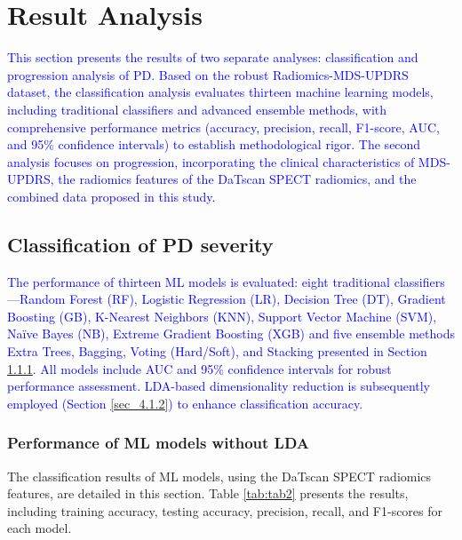 \documentclass[twocolumn]{article}
\begin{document}
\section{Result Analysis}
\label{Result}

\textcolor{blue}{This section presents the results of two separate analyses: classification and progression analysis of PD. Based on the robust Radiomics-MDS-UPDRS dataset, the classification analysis evaluates thirteen machine learning models, including traditional classifiers and advanced ensemble methods, with comprehensive performance metrics (accuracy, precision, recall, F1-score, AUC, and 95\% confidence intervals) to establish methodological rigor. The second analysis focuses on progression, incorporating the clinical characteristics of MDS-UPDRS, the radiomics features of the DaTscan SPECT radiomics, and the combined data proposed in this study. 
} 


\subsection{Classification of PD severity }
\textcolor{blue}{The performance of thirteen ML models is evaluated: eight traditional classifiers—Random Forest (RF), Logistic Regression (LR), Decision Tree (DT), Gradient Boosting (GB), K-Nearest Neighbors (KNN), Support Vector Machine (SVM), Naïve Bayes (NB), Extreme Gradient Boosting (XGB) and five ensemble methods Extra Trees, Bagging, Voting (Hard/Soft), and Stacking presented in Section \ref{sec_4.1.1}. All models include AUC and 95\% confidence intervals for robust performance assessment. LDA-based dimensionality reduction is subsequently employed (Section \ref{sec_4.1.2}) to enhance classification accuracy.}

\subsubsection{Performance of ML models without LDA}
\label{sec_4.1.1}
The classification results of ML models, using the DaTscan SPECT radiomics features, are detailed in this section. Table \ref{tab:tab2} presents the results, including training accuracy, testing accuracy, precision, recall, and F1-scores for each model. 
\end{document}

